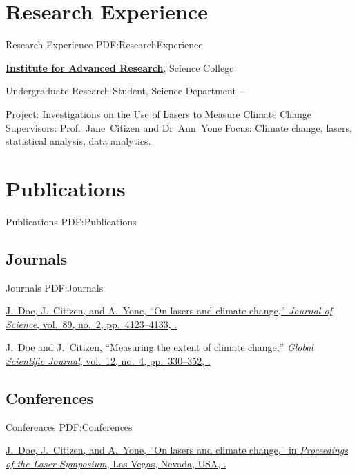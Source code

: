 \documentclass[letterpaper,MMMyyyy,nonstop]{simpleresumecv}
\begin{document}
\begin{body}

\section
{Research Experience}
{Research Experience}
{PDF:ResearchExperience}

\href{http://www.example.com/my-institute}
{\textbf{Institute for Advanced Research}},
Science College

\GapNoBreak
\BulletItem
Undergraduate Research Student, Science Department
\hfill
{} --
\begin{detail}
\SubBulletItem
Project:
Investigations on the Use of Lasers to Measure Climate Change
\SubBulletItem
Supervisors:
Prof.~Jane~Citizen and
Dr~Ann~Yone
\SubBulletItem
Focus:
Climate change, lasers, statistical analysis, data analytics.
\end{detail}


\section
{Publications}
{Publications}
{PDF:Publications}

\subsection
{Journals}
{Journals}
{PDF:Journals}

\GapNoBreak
\NumberedItem{[11]}
\href{http://www.example.com/my-paper-doi-5}
{\underline{J.~Doe}, J.~Citizen, and A.~Yone,
``On lasers and climate change,''
\textit{Journal of Science},
vol.~89,
no.~2,
pp.~4123--4133,
.}

\Gap
\NumberedItem{{\CharSpace}[1]}
\href{http://www.example.com/my-paper-doi-4}
{\underline{J.~Doe} and J.~Citizen,
``Measuring the extent of climate change,''
\textit{Global Scientific Journal},
vol.~12,
no.~4,
pp.~330--352,
.}

\BigGap
\subsection
{Conferences}
{Conferences}
{PDF:Conferences}

\GapNoBreak
\NumberedItem{[11]}
\href{http://www.example.com/my-paper-doi-3}
{\underline{J.~Doe}, J.~Citizen, and A.~Yone,
``On lasers and climate change,''
in \textit{Proceedings of the Laser Symposium},
Las Vegas, Nevada, USA,
.}


\end{body}
\end{document}
